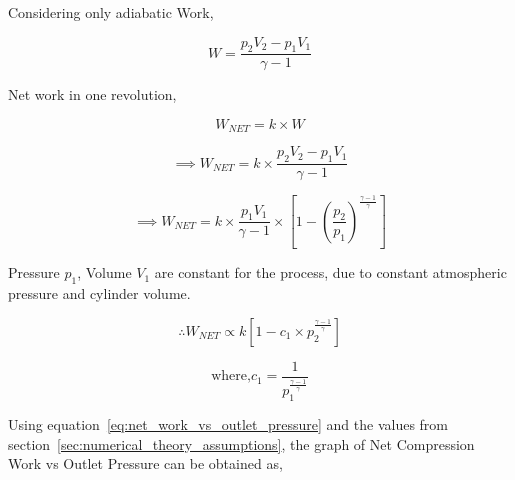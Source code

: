 \documentclass[12pt,a4paper]{article}
\begin{document}
		Considering only adiabatic Work,

		\begin{equation} \label{eq:compression_work}
			\boxed{W = \frac{p_2 V_2 - p_1 V_1}{\gamma - 1}}
		\end{equation}

		Net work in one revolution,

		\begin{equation*}
			W_{NET} = k \times W
		\end{equation*}

		\begin{equation} \label{eq:net_work}
			\implies \boxed{W_{NET} = k \times \frac{p_2 V_2 - p_1 V_1}{\gamma - 1}}
		\end{equation}

		\begin{equation*}
			\implies W_{NET} = k \times \frac{p_1 V_1}{\gamma - 1} \times \left[1 - \left(\frac{p_2}{p_1} \right) ^ \frac{\gamma - 1}{\gamma} \right]
		\end{equation*}


		Pressure \( p_1 \), Volume \( V_1 \) are constant for the process, due to constant atmospheric pressure and cylinder volume.

		\begin{equation} \label{eq:net_work_vs_outlet_pressure}
			\therefore \boxed{W_{NET} \propto k \left[1 - c_1 \times p_2 ^ \frac{\gamma - 1}{\gamma} \right]}
		\end{equation}

		\begin{equation*}
			\text{where,} c_1 = \frac{1}{p_1 ^ \frac{\gamma - 1}{\gamma}}
		\end{equation*}

		Using equation~\ref{eq:net_work_vs_outlet_pressure} and the values from section~\ref{sec:numerical_theory_assumptions}, the graph of Net Compression Work vs Outlet Pressure can be obtained as,
\end{document}
